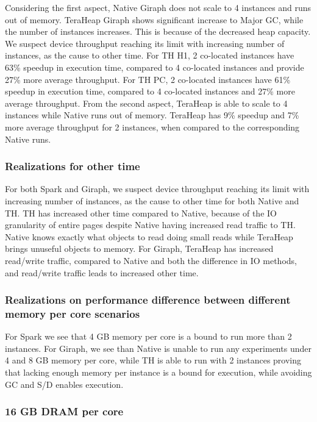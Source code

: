 Considering the first aspect, Native Giraph does not scale to 4 instances and runs out of memory. TeraHeap Giraph shows significant increase to Major GC, while the number of instances increases. This is because of the decreased heap capacity. We suspect device throughput reaching its limit with increasing number of instances, as the cause to other time. For TH H1, 2 co-located instances have 63\% speedup in execution time, compared to 4 co-located instances and provide 27\% more average throughput. For TH PC, 2 co-located instances have 61\% speedup in execution time, compared to 4 co-located instances and 27\% more average throughput. From the second aspect, TeraHeap is able to scale to 4 instances while Native runs out of memory. TeraHeap has 9\% speedup and 7\% more average throughput for 2 instances, when compared to the corresponding Native runs.

\subsubsection{Realizations for other time}
For both Spark and Giraph, we suspect device throughput reaching its limit with increasing number of instances, as the cause to other time for both Native and TH. TH has increased other time compared to Native, because of the IO granularity of entire pages despite Native having increased read traffic to TH. Native knows exactly what objects to read doing small reads while TeraHeap brings unuseful objects to memory. For Giraph, TeraHeap has increased read/write traffic, compared to Native and both the difference in IO methods, and read/write traffic leads to increased other time.

\subsubsection{Realizations on performance difference between different memory per core scenarios}
For Spark we see that 4 GB memory per core is a bound to run more than 2 instances. For Giraph, we see than Native is unable to run any experiments under 4 and 8 GB memory per core, while TH is able to run with 2 instances proving that lacking enough memory per instance is a bound for execution, while avoiding GC and S/D enables execution.

\iffalse
\subsubsection{16 GB DRAM per core}

